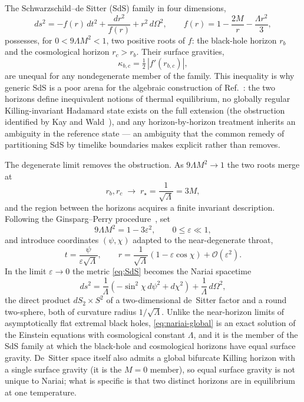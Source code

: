 \documentclass[11pt]{article}
\newcommand{\Nariai}{Nariai}
\begin{document}
The Schwarzschild--de Sitter (SdS) family in four dimensions,
\begin{equation}
ds^2 = -f(r)\,dt^2 + \frac{dr^2}{f(r)} + r^2\, d\Omega^2,
\qquad
f(r) = 1 - \frac{2M}{r} - \frac{\Lambda r^2}{3},
\label{eq:SdS}
\end{equation}
possesses, for $0 < 9\Lambda M^2 < 1$, two positive roots of $f$: the black-hole horizon $r_b$ and the cosmological horizon $r_c > r_b$. Their surface gravities,
\begin{equation}
\kappa_{b,c} = \tfrac{1}{2}\,|f'(r_{b,c})|,
\end{equation}
are unequal for any nondegenerate member of the family. This inequality is why generic SdS is a poor arena for the algebraic construction of Ref.~\cite{DorauMuch}: the two horizons define inequivalent notions of thermal equilibrium, no globally regular Killing-invariant Hadamard state exists on the full extension (the obstruction identified by Kay and Wald~\cite{KayWald}), and any horizon-by-horizon treatment inherits an ambiguity in the reference state --- an ambiguity that the common remedy of partitioning SdS by timelike boundaries \cite{Rusalev} makes explicit rather than removes.

The degenerate limit removes the obstruction. As $9\Lambda M^2 \to 1$ the two roots merge at
\begin{equation}
r_b, r_c \;\to\; r_\star = \frac{1}{\sqrt{\Lambda}} = 3M,
\end{equation}
and the region between the horizons acquires a finite invariant description. Following the Ginsparg--Perry procedure~\cite{GinspargPerry}, set
\begin{equation}
9\Lambda M^2 = 1 - 3\varepsilon^2, \qquad 0 \le \varepsilon \ll 1,
\end{equation}
and introduce coordinates $(\psi, \chi)$ adapted to the near-degenerate throat,
\begin{equation}
t = \frac{\psi}{\varepsilon\sqrt{\Lambda}},
\qquad
r = \frac{1}{\sqrt{\Lambda}}\left(1 - \varepsilon\cos\chi \right) + \mathcal{O}(\varepsilon^2).
\end{equation}
In the limit $\varepsilon \to 0$ the metric \eqref{eq:SdS} becomes the \Nariai{} spacetime~\cite{Nariai}
\begin{equation}
ds^2 = \frac{1}{\Lambda}\left(-\sin^2\!\chi \, d\psi^2 + d\chi^2\right) + \frac{1}{\Lambda}\, d\Omega^2 ,
\label{eq:nariai-global}
\end{equation}
the direct product $dS_2 \times S^2$ of a two-dimensional de~Sitter factor and a round two-sphere, both of curvature radius $1/\sqrt{\Lambda}$. Unlike the near-horizon limits of asymptotically flat extremal black holes, \eqref{eq:nariai-global} is an exact solution of the Einstein equations with cosmological constant $\Lambda$, and it is the member of the SdS family at which the black-hole and cosmological horizons have equal surface gravity. De~Sitter space itself also admits a global bifurcate Killing horizon with a single surface gravity (it is the $M=0$ member), so equal surface gravity is not unique to Nariai; what is specific is that two distinct horizons are in equilibrium at one temperature.
\end{document}
